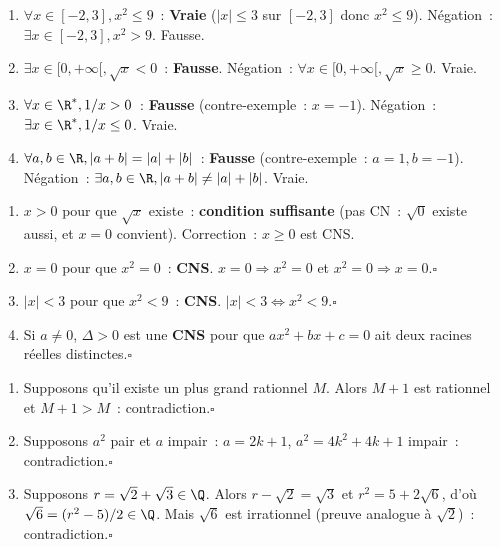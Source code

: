 
\begin{enumerate}
  \item $\forall x\in[-2,3], x^2\leq9$~: \textbf{Vraie}
        ($|x|\leq3$ sur $[-2,3]$ donc $x^2\leq9$).
        N\'egation~: $\exists x\in[-2,3], x^2>9$. Fausse.
  \item $\exists x\in[0,+\infty[, \sqrt{x}<0$~: \textbf{Fausse}.
        N\'egation~: $\forall x\in[0,+\infty[, \sqrt{x}\geq0$. Vraie.
  \item $\forall x\in\R^*, 1/x>0$~: \textbf{Fausse} (contre-exemple~: $x=-1$).
        N\'egation~: $\exists x\in\R^*, 1/x\leq0$. Vraie.
  \item $\forall a,b\in\R, |a+b|=|a|+|b|$~: \textbf{Fausse} (contre-exemple~: $a=1, b=-1$).
        N\'egation~: $\exists a,b\in\R, |a+b|\ne|a|+|b|$. Vraie.
\end{enumerate}


\begin{enumerate}
  \item $x>0$ pour que $\sqrt{x}$ existe~: \textbf{condition suffisante} (pas CN~:
        $\sqrt{0}$ existe aussi, et $x=0$ convient). Correction~: $x\geq0$ est CNS.
  \item $x=0$ pour que $x^2=0$~: \textbf{CNS}. $x=0\Rightarrow x^2=0$ et $x^2=0\Rightarrow x=0$.\hfill$\square$
  \item $|x|<3$ pour que $x^2<9$~: \textbf{CNS}. $|x|<3\Leftrightarrow x^2<9$.\hfill$\square$
  \item Si $a\ne0$, $\Delta>0$ est une \textbf{CNS} pour que
        $ax^2+bx+c=0$ ait deux racines r\'eelles distinctes.\hfill$\square$
\end{enumerate}


\begin{enumerate}
  \item Supposons qu'il existe un plus grand rationnel $M$.
        Alors $M+1$ est rationnel et $M+1>M$~: contradiction.\hfill$\square$
  \item Supposons $a^2$ pair et $a$ impair~: $a=2k+1$, $a^2=4k^2+4k+1$ impair~:
        contradiction.\hfill$\square$
  \item Supposons $r=\sqrt{2}+\sqrt{3}\in\Q$.
        Alors $r-\sqrt{2}=\sqrt{3}$ et $r^2=5+2\sqrt{6}$,
        d'o\`u $\sqrt{6}=(r^2-5)/2\in\Q$.
        Mais $\sqrt{6}$ est irrationnel (preuve analogue \`a $\sqrt{2}$)~: contradiction.\hfill$\square$
\end{enumerate}

